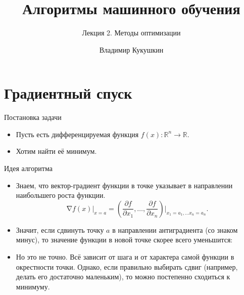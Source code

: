 \documentclass[9pt]{beamer}
\title{Алгоритмы машинного обучения}
\subtitle{Лекция 2. Методы оптимизации}
\author{Владимир Кукушкин}
\institute{СПбГЭУ - 18.11.2020}
\begin{document}
\titlepage

\section{Градиентный спуск}
\begin{frame}{Постановка задачи}
\begin{itemize}
    \item Пусть есть дифференцируемая функция $f(x): \mathbb{R}^n \rightarrow \mathbb{R}$.
    \item Хотим найти её минимум.
\end{itemize}
\end{frame}

\begin{frame}{Идея алгоритма}
    \begin{itemize}
        \item Знаем, что вектор-градиент функции в точке указывает в направлении наибольшего роста функции.
        $$\mathop{\nabla} f(x)\big|_{x=a} = \left(\frac{\partial f}{\partial x_1}, \ldots, \frac{\partial f}{\partial x_n}\right)\Big|_{x_1=a_1, \ldots x_n=a_n}.$$
        \item Значит, если сдвинуть точку $a$ в направлении антиградиента (со знаком минус), то значение функции в новой точке скорее всего уменьшится:
        \item Но это не точно. Всё зависит от шага и от характера самой функции в окрестности точки. Однако, если правильно выбирать сдвиг (например, делать его достаточно маленьким), то можно постепенно сходиться к минимуму.
    \end{itemize}
\end{frame}
\end{document}
